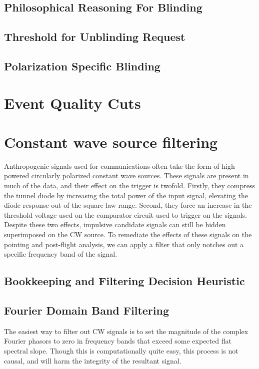 	\subsection{Philosophical Reasoning For Blinding}
	
	\subsection{Threshold for Unblinding Request}

	\subsection{Polarization Specific Blinding}

\section{Event Quality Cuts}

\section{Constant wave source filtering}
	Anthropogenic signals used for communications often take the form of high powered circularly polarized constant wave sources.  These signals are present in much of the data, and their effect on the trigger is twofold.  Firstly, they compress the tunnel diode by increasing the total power of the input signal, elevating the diode response out of the square-law range.  Second, they force an increase in the threshold voltage used on the comparator circuit used to trigger on the signals.  Despite these two effects, impulsive candidate signals can still be hidden superimposed on the CW source.  To remediate the effects of these signals on the pointing and post-flight analysis, we can apply a filter that only notches out a specific frequency band of the signal.
	\subsection{Bookkeeping and Filtering Decision Heuristic}
	\subsection{Fourier Domain Band Filtering}
			The easiest way to filter out CW signals is to set the magnitude of the complex Fourier phasors to zero in frequency bands that exceed some expected flat spectral slope.  Though this is computationally quite easy, this process is not causal, and will harm the integrity of the resultant signal.
